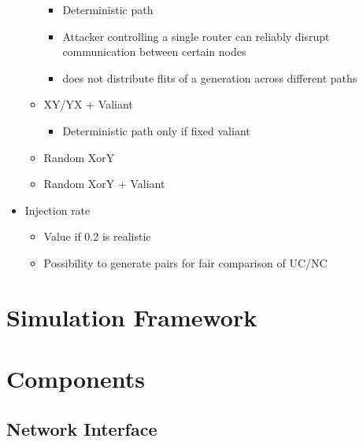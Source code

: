 \begin{itemize}
\begin{itemize}
                \begin{itemize}
                    \item Deterministic path
                    \item Attacker controlling a single router can reliably disrupt communication between certain nodes
                    \item does not distribute flits of a generation across different paths
                \end{itemize}
            \item XY/YX + Valiant
                \begin{itemize}
                    \item Deterministic path only if fixed valiant
                \end{itemize}
            \item Random XorY
            \item Random XorY + Valiant
        \end{itemize}
    \item Injection rate
        \begin{itemize}
            \item Value if 0.2 is realistic
            \item Possibility to generate pairs for fair comparison of UC/NC
        \end{itemize}
\end{itemize}

\section{Simulation Framework}

\section{Components}
\subsection{Network Interface}
